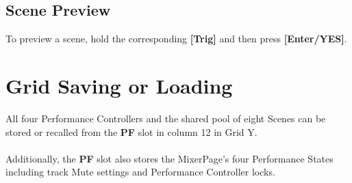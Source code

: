 \subsection{Scene Preview}
To preview a scene, hold the corresponding \textbf{[Trig]} and then press \textbf{[Enter/YES]}.
\section{Grid Saving or Loading}
All four Performance Controllers and the shared pool of eight Scenes can be stored or recalled from the \textbf{PF} slot in column 12 in Grid Y.\\\\
Additionally, the \textbf{PF} slot also stores the MixerPage's four Performance States including track Mute settings and Performance Controller locks.